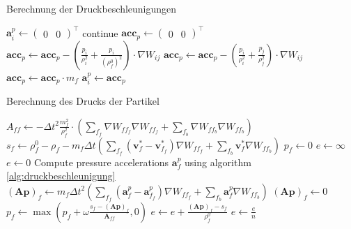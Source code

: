 \documentclass{scrreprt}
\begin{document}
\begin{algorithm}
\caption{Berechnung der Druckbeschleunigungen}
\label{alg:druckbeschleunigung}
\begin{algorithmic}
        \STATE $\textbf{a}_i^p \gets \begin{pmatrix}0 & 0 \end{pmatrix}^\intercal$
        \STATE continue
    \ENDIF
    \STATE $\textbf{acc}_p \gets \begin{pmatrix}0 & 0 \end{pmatrix}^\intercal$
    \STATE
    \STATE {}
            \STATE $\textbf{acc}_p \gets \textbf{acc}_p - \left(\frac{p_i}{\rho_i^2} + \frac{p_i}{\left(\rho_f^0\right)^2}\right) \cdot \nabla W_{ij}$ 
        \ELSE
            \STATE $\textbf{acc}_p \gets \textbf{acc}_p - \left(\frac{p_i}{\rho_i^2} + \frac{p_j}{\rho_j^2}\right) \cdot \nabla W_{ij}$
        \ENDIF
    \ENDFOR
    \STATE $\textbf{acc}_p \gets \textbf{acc}_p \cdot m_f$
    \STATE
    \STATE $\textbf{a}_i^p \gets \textbf{acc}_p$
\ENDFOR
\end{algorithmic}
\end{algorithm}

\begin{algorithm}
\caption{Berechnung des Drucks der Partikel}
\label{alg:druck}
\begin{algorithmic}[1]
        \STATE $A_{ff} \gets -\Delta t^2 \frac{m_f^2}{\rho_f^2} \cdot \left(\sum_{f_f}\nabla W_{ff_f} \nabla W_{ff_f} + \sum_{f_b}\nabla W_{ff_b} \nabla W_{ff_b}\right)$
        \STATE $s_f \gets \rho_f^0 - \rho_f - m_f \Delta t \left(\sum_{f_f}(\textbf{v}_f^* - \textbf{v}_{f_f}^*) \nabla W_{ff_f} + \sum_{f_b}\textbf{v}_f^* \nabla W_{ff_b}\right)$
        \STATE $p_f \gets 0$
    \ENDFOR
     \STATE $e \gets \infty$
        \STATE $e \gets 0$
        \STATE Compute pressure accelerations $\textbf{a}_f^p$ using algorithm \ref{alg:druckbeschleunigung}
            \STATE $(\textbf{A}\textbf{p})_f \gets m_f \Delta t^2\left(\sum_{f_f}(\textbf{a}_f^p - \textbf{a}_{f_f}^p) \nabla W_{ff_f} + \sum_{f_b}\textbf{a}_f^p \nabla W_{ff_b}\right)$
                \STATE $(\textbf{A}\textbf{p})_f \gets 0$
            \ENDIF
            \STATE $p_f \gets \max(p_f + \omega \frac{s_f - (\textbf{A}\textbf{p})_f}{\textbf{A}_{ff}}, 0)$
            \STATE $e \gets e + \frac{(\textbf{A}\textbf{p})_f - s_f}{\rho_f^0}$
        \ENDFOR
        \STATE $e \gets \frac{e}{n}$
    \ENDWHILE
\end{algorithmic}
\end{algorithm}
\end{document}
